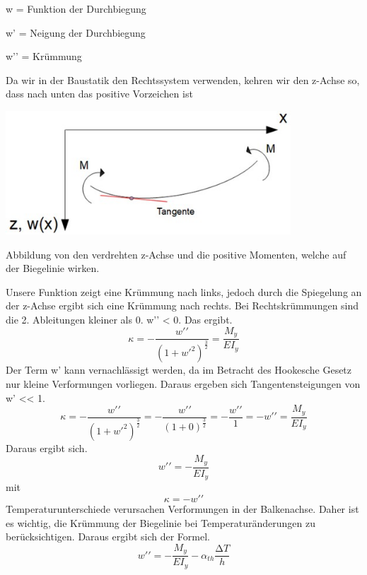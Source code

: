 w = Funktion der Durchbiegung

w’ = Neigung der Durchbiegung

w’’ = Krümmung

Da wir in der Baustatik den Rechtssystem verwenden, kehren wir den z-Achse so, dass nach unten das positive Vorzeichen ist

\begin{center}
	\includegraphics[width=0.8\textwidth]{papers/balken/images/teil2/BiegungverdrehteAchsen.jpg}
\end{center}
\caption{Abbildung von den verdrehten z-Achse und die positive Momenten, welche auf der Biegelinie wirken.}
Unsere Funktion zeigt eine Krümmung nach links, jedoch durch die Spiegelung an der z-Achse ergibt sich eine Krümmung nach rechts.
Bei Rechtskrümmungen sind die 2. Ableitungen kleiner als 0. w’’ < 0.
Das ergibt.
\begin{equation}
	\kappa=
	-\frac{w\prime\prime}{\left(1+{w\prime}^2\right)^\frac{3}{2}}=
	\frac{M_y}{EI_y}
\end{equation}
Der Term w’ kann vernachlässigt werden, da im Betracht des Hookesche Gesetz nur kleine Verformungen vorliegen.
Daraus ergeben sich Tangentensteigungen von w’ << 1.
\begin{equation}
	\kappa=
	-\frac{w\prime\prime}{\left(1+{w\prime}^2\right)^\frac{3}{2}}=
	-\frac{w\prime\prime}{\left(1+0\right)^\frac{3}{2}}=
	-\frac{w\prime\prime}{1}=-w\prime\prime=
	\frac{M_y}{EI_y}
\end{equation}
Daraus ergibt sich.
\begin{equation}
	w\prime\prime=
	-\frac{M_y}{EI_y}
\end{equation}
mit
\begin{equation}
	\kappa=
	-w\prime\prime
\end{equation}
Temperaturunterschiede verursachen Verformungen in der Balkenachse.
Daher ist es wichtig, die Krümmung der Biegelinie bei Temperaturänderungen zu berücksichtigen.
Daraus ergibt sich der Formel.
\begin{equation}
	w\prime\prime=
	-\frac{M_y}{EI_y}-\alpha_{th}\frac{∆T}{h}
\end{equation}

